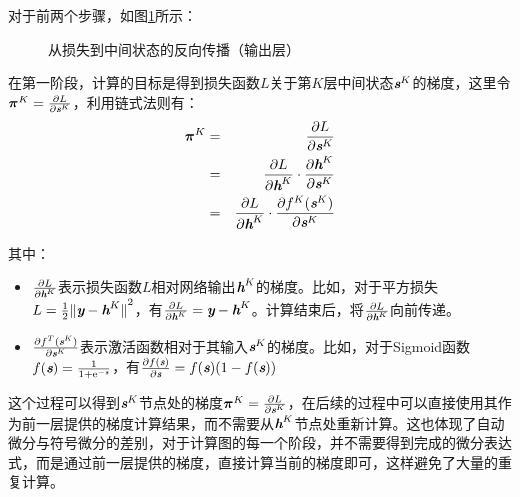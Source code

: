 \parinterval  对于前两个步骤，如图\ref{fig:9-54}所示：

\begin{figure}[htp]
\centering

\caption{从损失到中间状态的反向传播（输出层）}
\label{fig:9-54}
\end{figure}

\parinterval  在第一阶段，计算的目标是得到损失函数$ L $关于第$ K $层中间状态$ {\textbf{\em s}}^K $的梯度，这里令$ {\bm \pi}^K= \frac{\partial L}{\partial{\textbf{\em s}}^K} $，利用链式法则有：
\begin{eqnarray}
{\bm \pi}^K&=& \frac{\partial L}{\partial {\textbf{\em s}}^K}\nonumber\\
&=&\frac{\partial L}{\partial {\textbf{\em h}}^K}\cdot \frac{\partial {\textbf{\em h}}^K}{\partial {\textbf{\em s}}^K}\nonumber\\
&=&\frac{\partial L}{\partial {\textbf{\em h}}^K}\cdot \frac{\partial f^K({\textbf{\em s}}^K)}{\partial {\textbf{\em s}}^K}
\label{eq:9-49}
\end{eqnarray}

\noindent  其中：

\begin{spacing}{1.6}
\begin{itemize}
\vspace{0.5em}
\item $ \frac{\partial L}{\partial {\textbf{\em h}}^K} $表示损失函数$ L $相对网络输出$ {\textbf{\em h}}^K $的梯度。比如，对于平方损失$ L=\frac{1}{2}{\Vert {\textbf{\em y}}-{\textbf{\em h}}^K\Vert}^2 $，有$ \frac{\partial L}{\partial {\textbf{\em h}}^K}= {\textbf{\em y}} -{\textbf{\em h}}^K $。计算结束后，将$ \frac{\partial L}{\partial {\textbf{\em h}}^K} $向前传递。
\vspace{0.5em}
\item $ \frac{\partial f^T({\textbf{\em s}}^K)}{\partial {\textbf{\em s}}^K} $表示激活函数相对于其输入$ {\textbf{\em s}}^K $的梯度。比如，对于Sigmoid函数$ f({\textbf{\em s}})=\frac{1}{1+{\textrm e}^{- {\textbf{\em s}}}}$，有$ \frac{\partial f({\textbf{\em s}})}{\partial {\textbf{\em s}}}=f({\textbf{\em s}}) (1-f({\textbf{\em s}}))$
\vspace{0.5em}
\end{itemize}
\end{spacing}

\parinterval  这个过程可以得到$ {\textbf{\em s}}^K $节点处的梯度$ {\bm \pi}^K= \frac{\partial L}{\partial {\textbf{\em s}}^K} $，在后续的过程中可以直接使用其作为前一层提供的梯度计算结果，而不需要从$ {\textbf{\em h}}^K $节点处重新计算。这也体现了自动微分与符号微分的差别，对于计算图的每一个阶段，并不需要得到完成的微分表达式，而是通过前一层提供的梯度，直接计算当前的梯度即可，这样避免了大量的重复计算。

